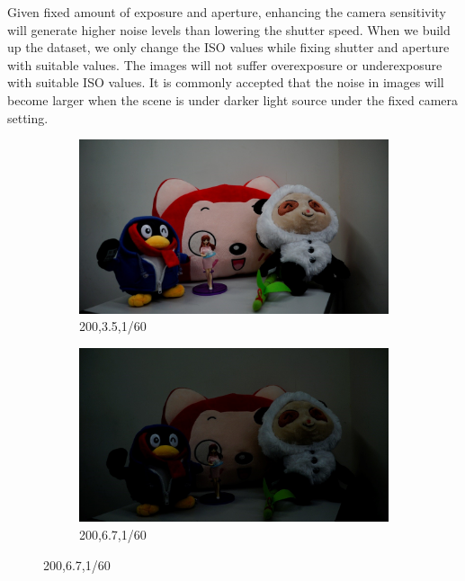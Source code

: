 Given fixed amount of exposure and aperture, enhancing the camera sensitivity will generate higher noise levels than lowering the shutter speed. When we build up the dataset, we only change the ISO values while fixing shutter and aperture with suitable values. The images will not suffer overexposure or underexposure with suitable ISO values. It is commonly accepted that the noise in images will become larger when the scene is under darker light source under the fixed camera setting.



\begin{figure}
    \centering
    \begin{subfigure}[t]{0.32\textwidth}
        \centering
        \includegraphics[width=1\textwidth]{images/dataset/200_3-5_1-60.jpg}
	   \caption{200,3.5,1/60}
    \end{subfigure}
    \hfill
    \begin{subfigure}[t]{0.32\textwidth}
        \centering
        \includegraphics[width=1\textwidth]{images/dataset/200_6-7_1-60.jpg}
		\caption{200,6.7,1/60}
    \end{subfigure}

\end{figure}
